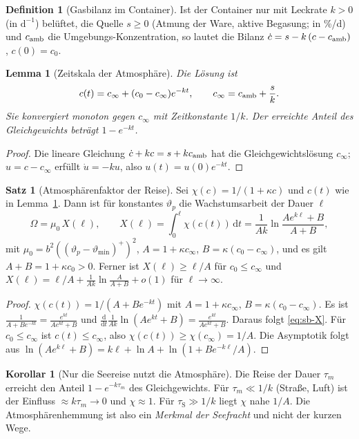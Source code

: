 \documentclass[a4paper, 12pt, twoside, openright]{report}
\newtheorem{lemma}[theorem]{Lemma}
\theoremstyle{definition}
\newtheorem{definition}[theorem]{Definition}
\theoremstyle{definition}
\newtheorem{satz}{Satz}[chapter]
\newtheorem{korollar}{Korollar}[chapter]
\begin{document}
\begin{definition}[Gasbilanz im Container]\label{def:sb-gas}
Ist der Container nur mit Leckrate $k>0$ (in $\mathrm d^{-1}$) belüftet, die Quelle $s\ge0$
(Atmung der Ware, aktive Begasung; in \%/d) und $c_{\rm amb}$ die Umgebungs-Konzentration,
so lautet die Bilanz $\dot c=s-k\,(c-c_{\rm amb})$, $c(0)=c_0$.
\end{definition}

\begin{lemma}[Zeitskala der Atmosphäre]\label{lem:sb-gas}
Die Lösung ist
\[
  c(t)=c_\infty+(c_0-c_\infty)e^{-kt},\qquad c_\infty=c_{\rm amb}+\frac{s}{k}.
\]
Sie konvergiert monoton gegen $c_\infty$ mit Zeitkonstante $1/k$. Der erreichte Anteil des
Gleichgewichts beträgt $1-e^{-kt}$.
\end{lemma}

\begin{proof}
Die lineare Gleichung $\dot c+kc=s+kc_{\rm amb}$ hat die Gleichgewichtslösung $c_\infty$;
$u=c-c_\infty$ erfüllt $\dot u=-ku$, also $u(t)=u(0)e^{-kt}$.
\end{proof}

\begin{satz}[Atmosphärenfaktor der Reise]\label{satz:sb-chi}
Sei $\chi(c)=1/(1+\kappa c)$ und $c(t)$ wie in Lemma~\ref{lem:sb-gas}. Dann ist für
konstantes $\vartheta_p$ die Wachstumsarbeit der Dauer $\ell$
\begin{equation}
  \Omega=\mu_0\,X(\ell),\qquad X(\ell)=\int_0^\ell\chi(c(t))\,\mathrm dt
  =\frac{1}{Ak}\ln\frac{Ae^{k\ell}+B}{A+B},
  \label{eq:sb-X}
\end{equation}
mit $\mu_0=b^2((\vartheta_p-\vartheta_{\min})^+)^2$, $A=1+\kappa c_\infty$, $B=\kappa(c_0-c_\infty)$,
und es gilt $A+B=1+\kappa c_0>0$. Ferner ist $X(\ell)\ge\ell/A$ für $c_0\le c_\infty$ und
$X(\ell)=\ell/A+\frac{1}{Ak}\ln\frac{A}{A+B}+o(1)$ für $\ell\to\infty$.
\end{satz}

\begin{proof}
$\chi(c(t))=1/(A+Be^{-kt})$ mit $A=1+\kappa c_\infty$, $B=\kappa(c_0-c_\infty)$. Es ist
$\frac{1}{A+Be^{-kt}}=\frac{e^{kt}}{Ae^{kt}+B}$ und $\frac{\mathrm d}{\mathrm dt}\frac{1}{Ak}\ln(Ae^{kt}+B)
=\frac{e^{kt}}{Ae^{kt}+B}$. Daraus folgt \eqref{eq:sb-X}. Für $c_0\le c_\infty$ ist $c(t)\le c_\infty$, also
$\chi(c(t))\ge\chi(c_\infty)=1/A$. Die Asymptotik folgt aus
$\ln(Ae^{k\ell}+B)=k\ell+\ln A+\ln(1+Be^{-k\ell}/A)$.
\end{proof}

\begin{korollar}[Nur die Seereise nutzt die Atmosphäre]\label{kor:sb-zeitskala}
Die Reise der Dauer $\tau_m$ erreicht den Anteil $1-e^{-k\tau_m}$ des Gleichgewichts.
Für $\tau_m\ll1/k$ (Straße, Luft) ist der Einfluss $\approx k\tau_m\to0$ und $\chi\approx1$.
Für $\tau_{\mathrm S}\gg1/k$ liegt $\chi$ nahe $1/A$. Die Atmosphärenhemmung ist also ein
\emph{Merkmal der Seefracht} und nicht der kurzen Wege.
\end{korollar}
\end{document}

